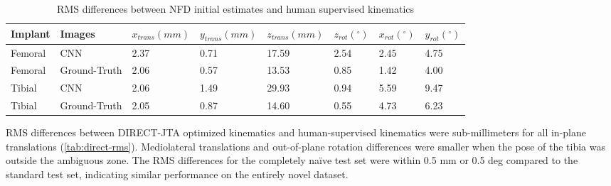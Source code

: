 \begin{landscape}
	\begin{table}[h!]
		\small
		\centering
		\caption{RMS differences between NFD initial estimates and human supervised kinematics}
		\label{tab:nfd-rms}
		\begin{tabularx}{1.0\linewidth}[h!]{XXXXXXXX}
			\hline
			Implant & Images       & $x_{trans} (mm)$ & $y_{trans} (mm)$ & $z_{trans} (mm)$ & $z_{rot} (^{\circ})$ & $x_{rot} (^{\circ})$ & $y_{rot} (^{\circ})$ \\ \hline
			Femoral & CNN          & 2.37             & 0.71             & 17.59            & 2.54                 & 2.45                 & 4.75                 \\
			Femoral & Ground-Truth & 2.06             & 0.57             & 13.53            & 0.85                 & 1.42                 & 4.00                 \\
			Tibial  & CNN          & 2.06             & 1.49             & 29.93            & 0.94                 & 5.59                 & 9.47                 \\
			Tibial  & Ground-Truth & 2.05             & 0.87             & 14.60            & 0.55                 & 4.73                 & 6.23                 \\ \hline
		\end{tabularx}
	\end{table}
\end{landscape}


RMS differences between DIRECT-JTA optimized kinematics and human-supervised kinematics were sub-millimeters for all in-plane translations (\cref{tab:direct-rms}).
Mediolateral translations and out-of-plane rotation differences were smaller when the pose of the tibia was outside the ambiguous zone.
The RMS differences for the completely naïve test set were within 0.5 mm or 0.5 deg compared to the standard test set, indicating similar performance on the entirely novel dataset.


